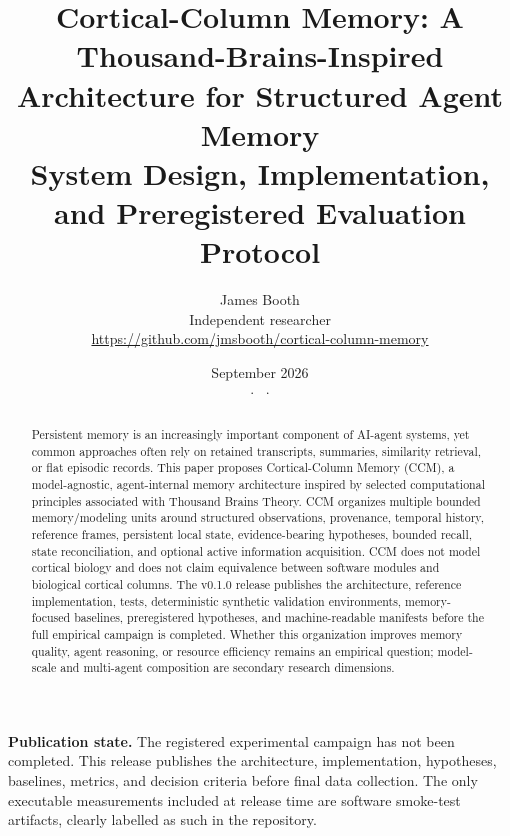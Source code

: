 \documentclass[11pt]{article}
\title{Cortical-Column Memory: A Thousand-Brains-Inspired Architecture for Structured Agent Memory\\[0.4em]
\large System Design, Implementation, and Preregistered Evaluation Protocol}
\author{James Booth\\Independent researcher\\\url{https://github.com/jmsbooth/cortical-column-memory}}
\date{September 2026\\\small \releaseversion{} · \statusline{} · \preprintstatus{}}
\newcommand{\ccmname}{Cortical-Column Memory (CCM)}
\newcommand{\releaseversion}{v0.1.0}
\begin{document}
\maketitle

\begin{abstract}
Persistent memory is an increasingly important component of AI-agent systems, yet common approaches often rely on retained transcripts, summaries, similarity retrieval, or flat episodic records. This paper proposes \ccmname{}, a model-agnostic, agent-internal memory architecture inspired by selected computational principles associated with Thousand Brains Theory. CCM organizes multiple bounded memory/modeling units around structured observations, provenance, temporal history, reference frames, persistent local state, evidence-bearing hypotheses, bounded recall, state reconciliation, and optional active information acquisition. CCM does not model cortical biology and does not claim equivalence between software modules and biological cortical columns. The \releaseversion{} release publishes the architecture, reference implementation, tests, deterministic synthetic validation environments, memory-focused baselines, preregistered hypotheses, and machine-readable manifests before the full empirical campaign is completed. Whether this organization improves memory quality, agent reasoning, or resource efficiency remains an empirical question; model-scale and multi-agent composition are secondary research dimensions.
\end{abstract}

\textbf{Publication state.} The registered experimental campaign has not been completed. This release publishes the architecture, implementation, hypotheses, baselines, metrics, and decision criteria before final data collection. The only executable measurements included at release time are software smoke-test artifacts, clearly labelled as such in the repository.











\appendix



\end{document}
